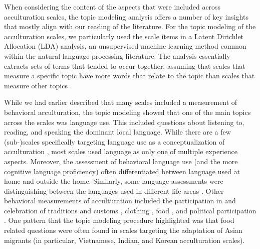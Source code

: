 \documentclass[man, 12pt, a4paper, mask]{apa7}
\newcommand{\siannotatedanalyses}{Supplemental Material B} %
\providecommand{\DIFaddbegin}{} %
\providecommand{\DIFaddend}{} %
\providecommand{\DIFdelbegin}{} %
\providecommand{\DIFdelend}{} %
\newcommand{\DIFscaledelfig}{0.5}
\newlength{\DIFdelgraphicswidth} %
\newlength{\DIFdelgraphicsheight} %
\newcommand{\DIFaddincludegraphics}[2][]{{\color{blue}\fbox{\DIFOincludegraphics[#1]{#2}}}} %
\newcommand{\DIFdelincludegraphics}[2][]{%
\sbox{\DIFdelgraphicsbox}{\DIFOincludegraphics[#1]{#2}}%
\settoboxwidth{\DIFdelgraphicswidth}{\DIFdelgraphicsbox} %
\settoboxtotalheight{\DIFdelgraphicsheight}{\DIFdelgraphicsbox} %
\scalebox{\DIFscaledelfig}{%
\parbox[b]{\DIFdelgraphicswidth}{\usebox{\DIFdelgraphicsbox}\\[-\baselineskip] \rule{\DIFdelgraphicswidth}{0em}}\llap{\resizebox{\DIFdelgraphicswidth}{\DIFdelgraphicsheight}{%
\setlength{\unitlength}{\DIFdelgraphicswidth}%
\begin{picture}(1,1)%
\thicklines\linethickness{2pt} %
{\color[rgb]{1,0,0}\put(0,0){\framebox(1,1){}}}%
{\color[rgb]{1,0,0}\put(0,0){\line( 1,1){1}}}%
{\color[rgb]{1,0,0}\put(0,1){\line(1,-1){1}}}%
\end{picture}%
}\hspace*{3pt}}} %
} %
\DeclareRobustCommand{\DIFaddbegin}{\DIFOaddbegin \let\includegraphics\DIFaddincludegraphics} %
\DeclareRobustCommand{\DIFaddend}{\DIFOaddend \let\includegraphics\DIFOincludegraphics} %
\DeclareRobustCommand{\DIFdelbegin}{\DIFOdelbegin \let\includegraphics\DIFdelincludegraphics} %
\DeclareRobustCommand{\DIFdelend}{\DIFOaddend \let\includegraphics\DIFOincludegraphics} %
\begin{document}
When considering the content of the aspects that were included across
acculturation scales, the topic modeling analysis offers a number of key
insights that mostly align with our reading of the literature. For the
topic modeling of the acculturation scales, we particularly used the
scale items in a Latent Dirichlet Allocation (LDA) analysis, an
unsupervised machine learning method common within the natural language
processing literature. The analysis essentially extracts sets of terms
that tended to occur together, assuming that scales that measure a
specific topic have more words that relate to the topic than scales that
measure other topics
\DIFdelbegin %
\DIFdelend \DIFaddbegin \citep[we followed the procedures outlined by][for a full methodological detail see \siannotatedanalyses]{Schweinberger2022}\DIFaddend .

While we had earlier described that many scales included a measurement
of behavioral acculturation, the topic modeling showed that one of the
main topics across the scales was language use. This included questions
about listening to, reading, and speaking the dominant local language.
While there are a few (sub-)scales specifically targeting language use
as a conceptualization of acculturation
\citep[e.g.,][]{Deyo1985, ICSEYteam2006}, most scales used language as
only one of multiple experience aspects. Moreover, the assessment of
behavioral language use (and the more cognitive language proficiency)
often differentiated between language used at home and outside the home.
Similarly, some language assessments were distinguishing between the
languages used in different life areas
\DIFdelbegin %
\DIFdelend \DIFaddbegin \citep[e.g., media consumption, among friends, at work][for more information see \siannotatedanalyses]{Birman2002}\DIFaddend .
Other behavioral measurements of acculturation included the
participation in and celebration of traditions and customs
\citep[e.g.,][]{Rezentes1993, Wilson2013, Cortes1994}, clothing
\citep[e.g.,][]{Ghuman2000}, food \citep[e.g.,][]{Schaefer2009}, and
political participation \citep[e.g.,][]{Jeong2016, Uslaner2005}. One
pattern that the topic modeling procedure highlighted was that food
related questions were often found in scales targeting the adaptation of
Asian migrants (in particular, Vietnamese, Indian, and Korean
acculturation scales).
\end{document}
